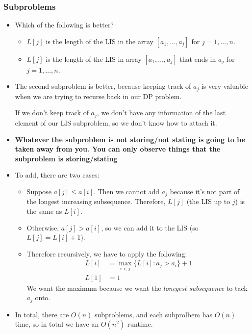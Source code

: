 	\subsubsection{Subproblems}
	\begin{itemize}
		\item Which of the following is better?
			\begin{itemize}
				\item $L[j]$ is the length of the LIS in the array $\left[ a_1, \dots, a_j \right] $ for 
					$j = 1, \dots, n$. 
				\item $L[j]$ is the length of the LIS in array $\left[ a_1, \dots, a_j \right] $ that 
					ends in $a_j$ for $j = 1, \dots, n$.

			\end{itemize}
		\item The second subproblem is better, because keeping track of $a_j$ is very valuable when we are 
			trying to recurse back in our DP problem. 

			If we don't keep track of $a_j$, we don't have any information of the last element of our 
			LIS subproblem, so we don't know how to attach it. 
		\item \textbf{Whatever the subproblem is not storing/not stating is going to be taken away from you.
			You can only observe things that the subproblem is storing/stating}
		\item To add, there are two cases:
			\begin{itemize}
				\item Suppose $a[j] \le a[i]$. Then we cannot add $a_j$ because it's not part of the 
					longest increasing subsequence. Therefore, $L[j]$ (the LIS up to $j$) is the same as 
					$L[i]$. 
				\item Otherwise, $a[j] > a[i]$, so we can add it to the LIS (so $L[j] = L[i] + 1$).
					

				\item Therefore recursively, we have to apply the following:
					\begin{align*}
						L[i] &= \max_{i < j} \{L[i]: a_j > a_i\} + 1\\
						L[1] &= 1
					\end{align*}
					We want the maximum because we want the \textit{lonegest subsequence} to tack $a_j$ 
					onto.
			\end{itemize}
		\item In total, there are $O(n)$ subproblems, and each subprolbem has $O(n)$ time, so in total 
			we have an $O(n^2)$ runtime. 
	\end{itemize}

